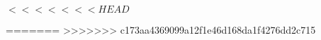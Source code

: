 
\raggedbottom

\tableofcontents
$ 






<<<<<<< HEAD
$


=======
>>>>>>> c173aa4369099a12f1e46d168da1f4276dd2c715

\begingroup
	\raggedright
	
\endgroup


